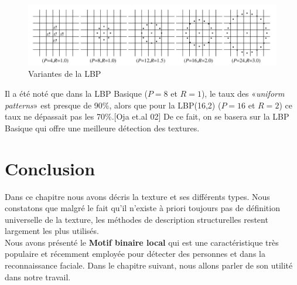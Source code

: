 \begin{figure}[H]
\centering
\includegraphics[width=15cm]{Figures/chap1/lbpvariantes.png}
\caption[lbpvar]{Variantes de la LBP}
\end{figure}

\indent Il a été noté que dans la LBP Basique ($P=8$ et $R=1$), le taux des «\textit{uniform patterns}» est presque de 90\%, alors que pour la LBP(16,2) ($P=16$ et $R=2$) ce taux ne dépassait pas les 70\%.[Oja et.al 02]
De ce fait, on se basera sur la LBP Basique qui offre une meilleure détection des textures.


\section{Conclusion}

\indent Dans ce chapitre nous avons décris la texture et ses différents types. Nous constatons que malgré le fait qu'il n'existe à priori toujours pas de définition universelle de la texture, les méthodes de description structurelles restent largement les plus utilisés.\\
\indent Nous avons présenté le \textbf{Motif binaire local} qui est une caractéristique très populaire et récemment employée pour détecter des personnes et dans la reconnaissance faciale.
Dans le chapitre suivant, nous allons parler de son utilité dans notre travail.